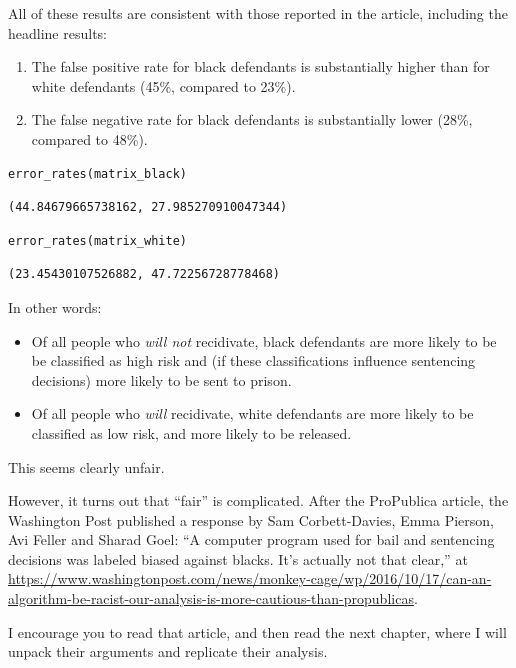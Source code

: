 All of these results are consistent with those reported in the article,
including the headline results:

\begin{enumerate}
\def\labelenumi{\arabic{enumi}.}
\item
  The false positive rate for black defendants is substantially higher
  than for white defendants (45\%, compared to 23\%).
\item
  The false negative rate for black defendants is substantially lower
  (28\%, compared to 48\%).
\end{enumerate}

\begin{lstlisting}[language=Python]
error_rates(matrix_black)
\end{lstlisting}

\begin{lstlisting}[]
(44.84679665738162, 27.985270910047344)
\end{lstlisting}

\begin{lstlisting}[language=Python]
error_rates(matrix_white)
\end{lstlisting}

\begin{lstlisting}[]
(23.45430107526882, 47.72256728778468)
\end{lstlisting}

In other words:

\begin{itemize}
\item
  Of all people who \emph{will not} recidivate, black defendants are
  more likely to be be classified as high risk and (if these
  classifications influence sentencing decisions) more likely to be sent
  to prison.
\item
  Of all people who \emph{will} recidivate, white defendants are more
  likely to be classified as low risk, and more likely to be released.
\end{itemize}

This seems clearly unfair.

However, it turns out that ``fair'' is complicated. After the ProPublica
article, the Washington Post published a response by Sam Corbett-Davies,
Emma Pierson, Avi Feller and Sharad Goel: ``A computer program used for
bail and sentencing decisions was labeled biased against blacks. It's
actually not that clear,'' at
\url{https://www.washingtonpost.com/news/monkey-cage/wp/2016/10/17/can-an-algorithm-be-racist-our-analysis-is-more-cautious-than-propublicas}.

I encourage you to read that article, and then read the next chapter,
where I will unpack their arguments and replicate their analysis.

